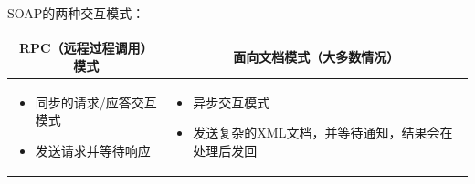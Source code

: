 \begin{solution}
SOAP的两种交互模式：
\begin{spacing}{1.2}
    \vspace{-0.5em}
    \begin{longtable}{|m{7.5cm}|m{7.5cm}|}
        \hline
        \multicolumn{1}{|c|}{\textbf{RPC（远程过程调用）模式}} & \multicolumn{1}{c|}{\textbf{面向文档模式（大多数情况）}} \\ \hline
        \vspace{-1.3em}
        \begin{itemize}[leftmargin=1.5em,itemsep=-3pt]
            \item 同步的请求/应答交互模式
            \item 发送请求并等待响应
        \vspace{-1.5em}
        \end{itemize}                                           
            & 
        \vspace{-1.3em}
        \begin{itemize}[leftmargin=1.5em,itemsep=-3pt]
            \item 异步交互模式
            \item 发送复杂的XML文档，并等待通知，结果会在处理后发回
        \vspace{-1.5em}
        \end{itemize}  
        \\ \hline
    \end{longtable}
    \vspace{-1em}
\end{spacing}

\end{solution}